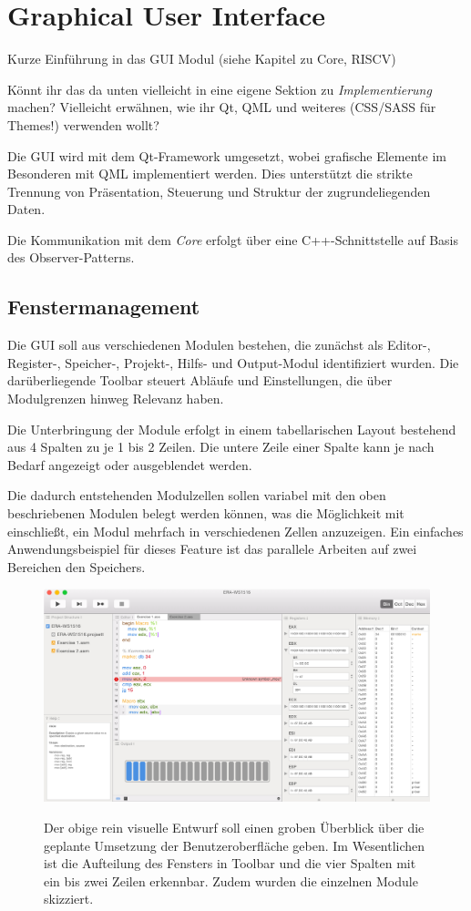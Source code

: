\chapter{Graphical User Interface}

{\color{red} Kurze Einführung in das GUI Modul (siehe Kapitel zu Core, RISCV)}

{\color{red} Könnt ihr das da unten vielleicht in eine eigene Sektion zu
  \emph{Implementierung} machen? Vielleicht erwähnen, wie ihr Qt, QML und
  weiteres (CSS/SASS für Themes!) verwenden wollt?}

Die GUI wird mit dem Qt-Framework umgesetzt, wobei grafische Elemente im
Besonderen mit QML implementiert werden. Dies unterstützt die strikte Trennung
von Präsentation, Steuerung und Struktur der zugrundeliegenden Daten.

Die Kommunikation mit dem \textit{Core} erfolgt über eine C++-Schnittstelle auf
Basis des Observer-Patterns.


\section{Fenstermanagement}

Die GUI soll aus verschiedenen Modulen bestehen, die zunächst als Editor-,
Register-, Speicher-, Projekt-, Hilfs- und Output-Modul identifiziert
wurden. Die darüberliegende Toolbar steuert Abläufe und Einstellungen, die über
Modulgrenzen hinweg Relevanz haben.

Die Unterbringung der Module erfolgt in einem tabellarischen Layout bestehend
aus 4 Spalten zu je 1 bis 2 Zeilen. Die untere Zeile einer Spalte kann je nach
Bedarf angezeigt oder ausgeblendet werden.

Die dadurch entstehenden Modulzellen sollen variabel mit den oben beschriebenen
Modulen belegt werden können, was die Möglichkeit mit einschließt, ein Modul
mehrfach in verschiedenen Zellen anzuzeigen. Ein einfaches Anwendungsbeispiel
für dieses Feature ist das parallele Arbeiten auf zwei Bereichen den Speichers.

\begin{figure}
  \includegraphics[width=\textwidth]{../ui/figures/mockup}
  \label{fig:Mockup}
  \caption{Der obige rein visuelle Entwurf soll einen groben Überblick über die
    geplante Umsetzung der Benutzeroberfläche geben. Im Wesentlichen ist die
    Aufteilung des Fensters in Toolbar und die vier Spalten mit ein bis zwei
    Zeilen erkennbar. Zudem wurden die einzelnen Module skizziert.}
\end{figure}

